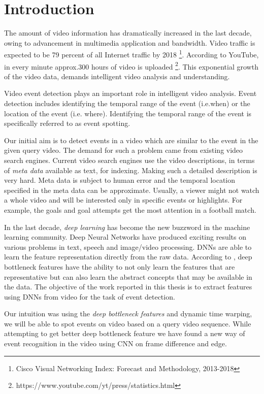 \chapter{Introduction}
\label{chap:intro}

The amount of video information has dramatically increased in the last decade, owing to advancement in multimedia application and bandwidth.  Video traffic is expected to be  79 percent of all Internet traffic by 2018 \footnote{Cisco Visual Networking Index: Forecast and Methodology, 2013-2018}.  According to YouTube, in every minute approx.300 hours of video is uploaded \footnote{https://www.youtube.com/yt/press/statistics.html}.  This exponential growth of the video data, demands intelligent video analysis and understanding.

Video event detection plays an important role in intelligent video analysis.  Event detection includes identifying the temporal range of the event (i.e.when) or the location of the event (i.e.  where).  Identifying the temporal range of the event is specifically referred to as event spotting. 

Our initial aim is to detect events in a video which are similar to the event in the given query video.  The demand for such a problem came from existing video search engines.  Current video search engines use the video descriptions, in terms of  \textit{meta data} available as text, for indexing.  Making such a detailed description is very hard.  Meta data is subject to human error and the temporal location specified in the meta data can be approximate.  Usually, a viewer might not watch a whole video and will be interested only in specific events or highlights.  For example, the goals and goal attempts get the most attention in a football match.

In the last decade, \textit{deep learning} has become the new buzzword in the machine learning community.  Deep Neural Networks have produced exciting results on various problems in text, speech and image/video processing.  DNNs are able to learn the feature representation directly from the raw data.  According to \citet{hinton2009deep}, deep bottleneck features have the ability to not only learn the features that are representative but can also learn the abstract concepts that may be available in the data.   The objective of the work reported in this thesis is to extract features using DNNs from video for the task of event detection.

Our intuition was using the \textit{deep bottleneck features} and dynamic time warping, we will be able to spot events on video based on a query video sequence.  While attempting  to get better deep bottleneck feature we have found a new  way of event recognition in the video using CNN on frame difference and edge.

